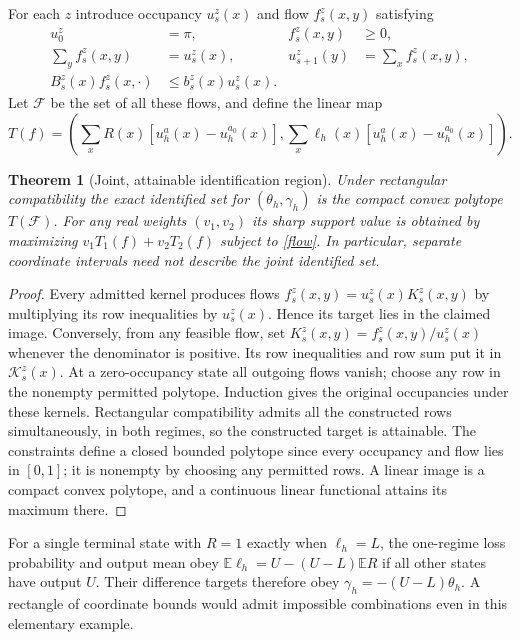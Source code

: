 \documentclass[11pt]{article}
\newtheorem{theorem}{Theorem}
\newcommand{\E}{\mathbb E}
\begin{document}
For each $z$ introduce occupancy $u_s^z(x)$ and flow $f_s^z(x,y)$ satisfying
\begin{align}
 u_0^z&=\pi,& f_s^z(x,y)&\geq0,\nonumber\\
 \sum_y f_s^z(x,y)&=u_s^z(x),&
 u_{s+1}^z(y)&=\sum_x f_s^z(x,y),\label{flow}\\
 B_s^z(x)f_s^z(x,\cdot)&\leq b_s^z(x)u_s^z(x).\nonumber
\end{align}
Let $\mathcal F$ be the set of all these flows, and define the linear map
\[
 T(f)=\left(\sum_xR(x)[u_h^a(x)-u_h^{a_0}(x)],
            \sum_x\ell_h(x)[u_h^a(x)-u_h^{a_0}(x)]\right).
\]
\begin{theorem}[Joint, attainable identification region]\label{joint}
Under rectangular compatibility the exact identified set for
$(\theta_h,\gamma_h)$ is the compact convex polytope $T(\mathcal F)$.
For any real weights $(v_1,v_2)$ its sharp support value is obtained by
maximizing $v_1T_1(f)+v_2T_2(f)$ subject to \eqref{flow}. In particular,
separate coordinate intervals need not describe the joint identified set.
\end{theorem}
\begin{proof}
Every admitted kernel produces flows
$f_s^z(x,y)=u_s^z(x)K_s^z(x,y)$ by multiplying its row inequalities by
$u_s^z(x)$. Hence its target lies in the claimed image. Conversely, from
any feasible flow, set $K_s^z(x,y)=f_s^z(x,y)/u_s^z(x)$ whenever the
denominator is positive. Its row inequalities and row sum put it in
$\mathcal K_s^z(x)$. At a zero-occupancy state all outgoing flows vanish;
choose any row in the nonempty permitted polytope. Induction gives the
original occupancies under these kernels. Rectangular compatibility
admits all the constructed rows simultaneously, in both regimes, so the
constructed target is attainable. The constraints define a closed bounded
polytope since every occupancy and flow lies in $[0,1]$; it is nonempty
by choosing any permitted rows. A linear image is a compact convex
polytope, and a continuous linear functional attains its maximum there.
\end{proof}

For a single terminal state with $R=1$ exactly when
$\ell_h=L$, the one-regime loss probability and output mean obey
$\E\ell_h=U-(U-L)\E R$ if all other states have output $U$.
Their difference targets therefore obey
$\gamma_h=-(U-L)\theta_h$. A rectangle of coordinate bounds would admit
impossible combinations even in this elementary example.
\end{document}

